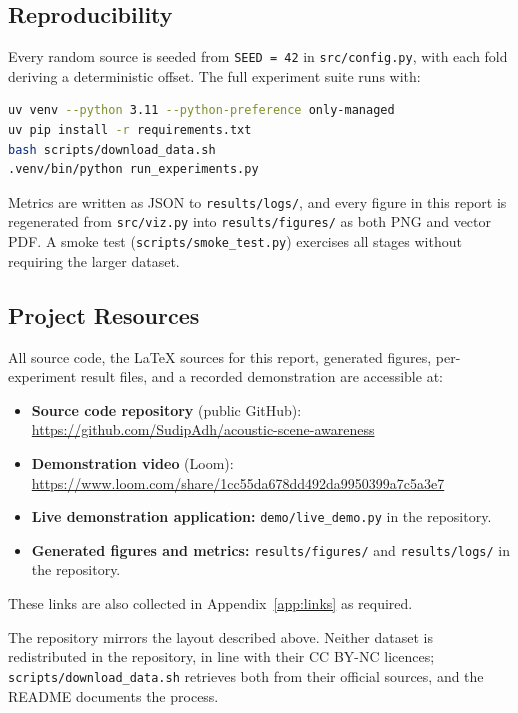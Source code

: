 \documentclass[11pt, a4paper]{article}
\newcommand{\repourl}{https://github.com/SudipAdh/acoustic-scene-awareness}
\newcommand{\youtubeurl}{\url{https://www.loom.com/share/1cc55da678dd492da9950399a7c5a3e7}}
\begin{document}
\subsection{Reproducibility}

Every random source is seeded from \texttt{SEED = 42} in \texttt{src/config.py}, with each fold deriving a deterministic offset. The full experiment suite runs with:

\begin{lstlisting}[language=bash, basicstyle=\ttfamily\small, numbers=none]
uv venv --python 3.11 --python-preference only-managed
uv pip install -r requirements.txt
bash scripts/download_data.sh
.venv/bin/python run_experiments.py
\end{lstlisting}

Metrics are written as JSON to \texttt{results/logs/}, and every figure in this report is regenerated from \texttt{src/viz.py} into \texttt{results/figures/} as both PNG and vector PDF. A smoke test (\texttt{scripts/smoke\_test.py}) exercises all stages without requiring the larger dataset.

\subsection{Project Resources}
\label{sec:repo}

All source code, the LaTeX sources for this report, generated figures, per-experiment result files, and a recorded demonstration are accessible at:

\begin{itemize}[leftmargin=2.2em]
    \item \textbf{Source code repository} (public GitHub):\\
          \url{\repourl}
    \item \textbf{Demonstration video} (Loom):\\
          \youtubeurl
    \item \textbf{Live demonstration application:} \texttt{demo/live\_demo.py} in the repository.
    \item \textbf{Generated figures and metrics:} \texttt{results/figures/} and \texttt{results/logs/} in the repository.
\end{itemize}

These links are also collected in Appendix~\ref{app:links} as required.

The repository mirrors the layout described above. Neither dataset is redistributed in the repository, in line with their CC BY-NC licences; \texttt{scripts/download\_data.sh} retrieves both from their official sources, and the README documents the process.
\end{document}
